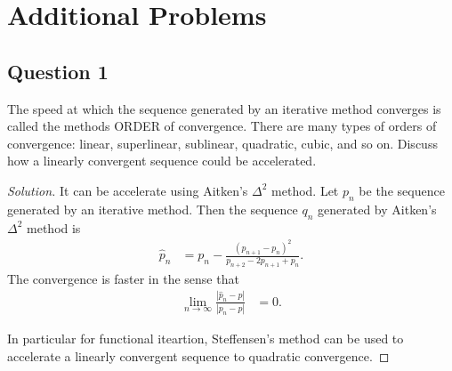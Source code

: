 \documentclass{article}
\begin{document}
\section*{Additional Problems}
\subsection*{Question 1}
The speed at which the sequence generated by an iterative method converges is called the
methods ORDER of convergence. There are many types of orders of convergence: linear, superlinear, 
sublinear, quadratic, cubic, and so on. Discuss how a linearly convergent sequence
could be accelerated.
\begin{proof}[Solution]
    It can be accelerate using Aitken's $\Delta^2$ method. Let $p_n$ be the sequence generated by 
    an iterative method. Then the sequence $q_n$ generated by Aitken's $\Delta^2$ method is 
    \begin{align*}
        \hat{p}_n & = p_n - \frac{(p_{n+1}-p_n)^2}{p_{n+2}-2p_{n+1}+p_n}.
    \end{align*}
    The convergence is faster in the sense that 
    \begin{align*}
        \lim_{n\rightarrow\infty}\frac{|\hat{p}_n-p|}{|p_n-p|} & = 0.
    \end{align*}

    In particular for functional iteartion, Steffensen's method can be used to accelerate a 
    linearly convergent sequence to quadratic convergence. 
\end{proof}
\end{document}
